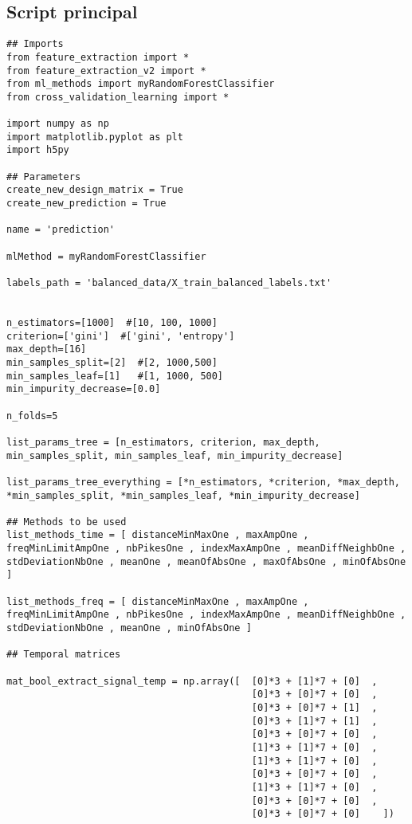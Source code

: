 \documentclass{article}
\begin{document}
\subsection{Script principal}
\begin{lstlisting}
## Imports
from feature_extraction import *
from feature_extraction_v2 import *
from ml_methods import myRandomForestClassifier
from cross_validation_learning import *

import numpy as np
import matplotlib.pyplot as plt
import h5py

## Parameters
create_new_design_matrix = True
create_new_prediction = True

name = 'prediction'

mlMethod = myRandomForestClassifier

labels_path = 'balanced_data/X_train_balanced_labels.txt'


n_estimators=[1000]  #[10, 100, 1000]
criterion=['gini']  #['gini', 'entropy']
max_depth=[16]
min_samples_split=[2]  #[2, 1000,500]
min_samples_leaf=[1]   #[1, 1000, 500] 
min_impurity_decrease=[0.0]

n_folds=5

list_params_tree = [n_estimators, criterion, max_depth, min_samples_split, min_samples_leaf, min_impurity_decrease]

list_params_tree_everything = [*n_estimators, *criterion, *max_depth, *min_samples_split, *min_samples_leaf, *min_impurity_decrease]

## Methods to be used
list_methods_time = [ distanceMinMaxOne , maxAmpOne , freqMinLimitAmpOne , nbPikesOne , indexMaxAmpOne , meanDiffNeighbOne , stdDeviationNbOne , meanOne , meanOfAbsOne , maxOfAbsOne , minOfAbsOne ]

list_methods_freq = [ distanceMinMaxOne , maxAmpOne , freqMinLimitAmpOne , nbPikesOne , indexMaxAmpOne , meanDiffNeighbOne , stdDeviationNbOne , meanOne , minOfAbsOne ]

## Temporal matrices

mat_bool_extract_signal_temp = np.array([  [0]*3 + [1]*7 + [0]  ,
                                           [0]*3 + [0]*7 + [0]  ,
                                           [0]*3 + [0]*7 + [1]  ,
                                           [0]*3 + [1]*7 + [1]  ,
                                           [0]*3 + [0]*7 + [0]  ,
                                           [1]*3 + [1]*7 + [0]  ,
                                           [1]*3 + [1]*7 + [0]  ,
                                           [0]*3 + [0]*7 + [0]  ,
                                           [1]*3 + [1]*7 + [0]  ,
                                           [0]*3 + [0]*7 + [0]  ,
                                           [0]*3 + [0]*7 + [0]    ])


\end{lstlisting}
\end{document}
